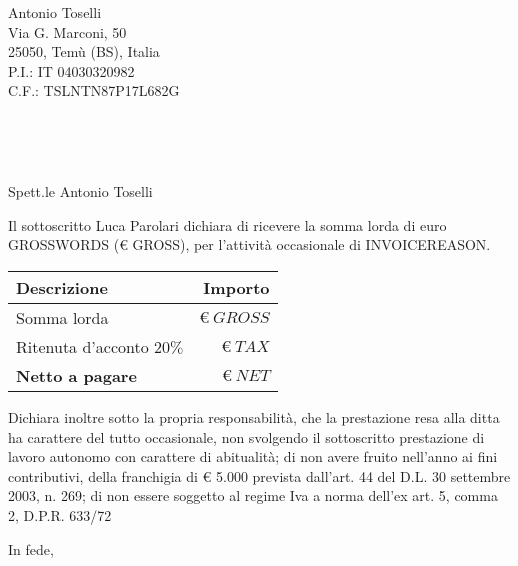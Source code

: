 \documentclass[12pt, a4paper]{letter} %
\renewcommand{\opening}[1]{
	{\centering\fromaddress\vspace{0.05\textheight} \\ %
	}%
	{\raggedright \toname \\ \toaddress \par} %
	\vspace{1cm} %
	\noindent #1 %
}
\renewcommand{\closing}[1]{
	\vspace{2.5mm} %
	\noindent %
	\hspace*{\longindentation} %
	\parbox{\indentedwidth}{
		\raggedright
		#1 %
		\vskip 1.65cm %
		\fromsig %
	}
}
\begin{document}

\begin{letter}{
	Antonio Toselli\\
	Via G. Marconi, 50\\
	25050, Temù (BS), Italia\\
	P.I.: IT 04030320982\\
	C.F.: TSLNTN87P17L682G
}


\opening{Spett.le Antonio Toselli}

Il sottoscritto Luca Parolari dichiara di ricevere la somma lorda di euro
GROSSWORDS (€ GROSS), per l’attività occasionale di INVOICEREASON.

\begin{center}
\begin{tabularx}{300pt}{|X|r|}
  	\textbf{Descrizione} & \textbf{Importo}\\
	\hline
	Somma lorda & $\euro\ GROSS$\\
	Ritenuta d'acconto $20\%$ & $\euro\ TAX$\\
	\textbf{Netto a pagare} & $\euro\ NET$\\
\end{tabularx}
\end{center}

Dichiara inoltre sotto la propria responsabilità, che la prestazione resa alla
ditta ha carattere del tutto occasionale, non svolgendo il sottoscritto
prestazione di lavoro autonomo con carattere di abitualità; di non avere fruito
nell’anno ai fini contributivi, della franchigia di \euro{} 5.000 prevista dall’art. 44
del D.L. 30 settembre 2003, n. 269; di non essere soggetto al regime Iva a
norma dell’ex art. 5, comma 2, D.P.R. 633/72

\closing{In fede,}




\end{letter}
\end{document}

